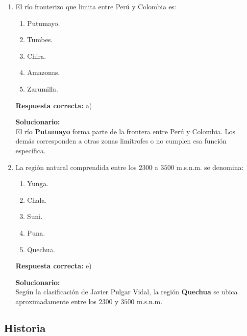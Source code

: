\begin{enumerate}
	
	
	\item El río fronterizo que limita entre Perú y Colombia es:
	\begin{enumerate}[label=\alph*)]
		\item Putumayo.
		\item Tumbes.
		\item Chira.
		\item Amazonas.
		\item Zarumilla.
	\end{enumerate}
	\textbf{Respuesta correcta:} a)
	
	\vspace{2mm}
	\textbf{Solucionario:}\\
	El río \textbf{Putumayo} forma parte de la frontera entre Perú y Colombia.  
	Los demás corresponden a otras zonas limítrofes o no cumplen esa función específica.
	
	\vspace{6mm}
	
	\item La región natural comprendida entre los $2300$ a $3500$ m.s.n.m. se denomina:
	\begin{enumerate}[label=\alph*)]
		\item Yunga.
		\item Chala.
		\item Suni.
		\item Puna.
		\item Quechua.
	\end{enumerate}
	\textbf{Respuesta correcta:} e)
	
	\vspace{2mm}
	\textbf{Solucionario:}\\
	Según la clasificación de Javier Pulgar Vidal, la región \textbf{Quechua} se ubica aproximadamente entre los $2300$ y $3500$ m.s.n.m.
	
	\vspace{6mm}
	
\end{enumerate}

\subsection*{Historia}

